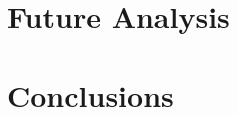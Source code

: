 \documentclass[%
 amsmath,amssymb,
 aps,
 prc
]{revtex4-1}
\begin{document}


\section{Future Analysis}
\label{future_analysis}
%


\section{Conclusions}
\label{sec:Conclusions}
%


\clearpage %
{}

\end{document}
